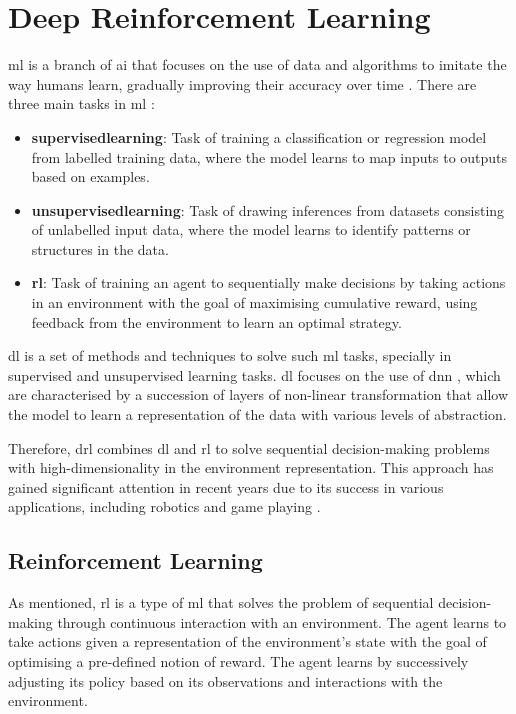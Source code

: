 \section{Deep Reinforcement Learning} \label{sec:deepreinforcementlearning}

\acrlong{ml} is a branch of \acrfull{ai} that focuses on the use of data and algorithms to imitate the way humans learn, gradually improving their accuracy over time \cite{IBM2021}. There are three main tasks in \acrshort{ml} \cite{Francois-Lavet2018}:

\begin{itemize}
    \item \textbf{\Gls{supervisedlearning}}: Task of training a classification or regression model from labelled training data, where the model learns to map inputs to outputs based on examples.
    \item \textbf{\Gls{unsupervisedlearning}}: Task of drawing inferences from datasets consisting of unlabelled input data, where the model learns to identify patterns or structures in the data.
    \item \textbf{\acrlong{rl}}: Task of training an agent to sequentially make decisions by taking actions in an environment with the goal of maximising cumulative reward, using feedback from the environment to learn an optimal strategy.
\end{itemize}

\acrlong{dl} is a set of methods and techniques to solve such \acrshort{ml} tasks, specially in supervised and unsupervised learning tasks. \acrshort{dl} focuses on the use of \acrfull{dnn} \cite{Goodfellow2016}, which are characterised by a succession of layers of non-linear transformation that allow the model to learn a representation of the data with various levels of abstraction.

Therefore, \acrfull{drl} combines \acrfull{dl} and \acrfull{rl} to solve sequential decision-making problems with high-dimensionality in the environment representation. This approach has gained significant attention in recent years due to its success in various applications, including robotics \cite{Tang2024} and game playing \cite{Shao2019,Silver2016}.

\subsection{Reinforcement Learning} \label{sec:reinforcementlearning}

As mentioned, \acrshort{rl} is a type of \acrshort{ml} that solves the problem of sequential decision-making through continuous interaction with an environment. The agent learns to take actions given a representation of the environment's state with the goal of optimising a pre-defined notion of reward. The agent learns by successively adjusting its policy based on its observations and interactions with the environment. 


